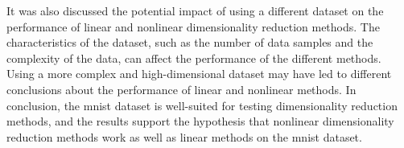 It was also discussed the potential impact of using a different dataset on the performance of linear and nonlinear dimensionality reduction methods. The characteristics of the dataset, such as the number of data samples and the complexity of the data, can affect the performance of the different methods. Using a more complex and high-dimensional dataset may have led to different conclusions about the performance of linear and nonlinear methods. In conclusion, the \gls{mnist} dataset is well-suited for testing dimensionality reduction methods, and the results support the hypothesis that nonlinear dimensionality reduction methods work as well as linear methods on the \gls{mnist} dataset.